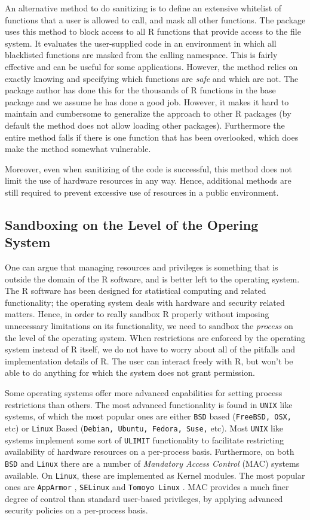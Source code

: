 \documentclass[article]{jss}
\newcommand{\R}{\textsf{R}\xspace}
\newcommand{\AppArmor}{\texttt{AppArmor}\xspace}
\newcommand{\Linux}{\texttt{Linux}\xspace}
\newcommand{\ULIMIT}{\texttt{ULIMIT}\xspace}
\begin{document}
An alternative method to do sanitizing is to define an extensive whitelist of
functions that a user is allowed to call, and mask all other functions. The
 \citep{sandboxR} package uses this method to block access
to all \R functions that provide access to the file system. It evaluates
the user-supplied code in an environment in which all blacklisted
functions are masked from the calling namespace. This is fairly effective and
can be useful for some applications. However, the method relies on exactly
knowing and specifying which functions are \emph{safe} and which are not. The
package author has done this for the thousands of \R functions in the
base package and we assume he has done a good job. However, it makes it hard to
maintain and cumbersome to generalize the approach to other \R packages (by
default the method does not allow loading other packages). Furthermore the
entire method falls if there is one function that has been
overlooked, which does make the method somewhat vulnerable.

Moreover, even when sanitizing of the code is successful, this method does not
limit the use of hardware resources in any way. Hence, additional methods are
still required to prevent excessive use of resources in a public environment.

\subsection{Sandboxing on the Level of the Opering System}

One can argue that managing resources and privileges is something that
is outside the domain of the \R software, and is better left to the
operating system. The \R software has been designed for statistical
computing and related functionality; the operating system deals with hardware
and security related matters. Hence, in order to really sandbox \R
properly without imposing unnecessary limitations on its functionality, we need
to sandbox the \emph{process} on the level of the operating system. When
restrictions are enforced by the operating system instead of \R
itself, we do not have to worry about all of the pitfalls and implementation
details of \R. The user can interact freely with \R, but
won't be able to do anything for which the system does not grant permission. 

Some operating systems offer more advanced capabilities for setting process
restrictions than others. The most advanced functionality is found in
\texttt{UNIX} like systems, of which the most popular ones are either
\texttt{BSD} based (\texttt{FreeBSD, OSX,} etc) or \Linux Based
(\texttt{Debian, Ubuntu, Fedora, Suse,} etc). Most \texttt{UNIX} like
systems implement some sort of \ULIMIT functionality to facilitate
restricting availability of hardware resources on a per-process basis.
Furthermore, on both \texttt{BSD} and \Linux there are a number of
\emph{Mandatory Access Control} (MAC) systems available. On \Linux,
these are implemented as Kernel modules. The most popular ones are \AppArmor
\citep{apparmor}, \texttt{SELinux} \citep{selinux} and \texttt{Tomoyo Linux}
\citep{tomoyo}. MAC provides a much finer degree of control than standard
user-based privileges, by applying advanced security policies on a per-process
basis.
\end{document}
